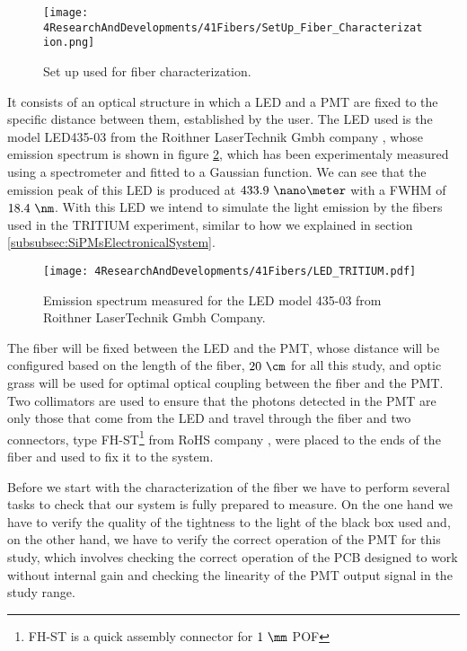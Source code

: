\begin{figure}[h]
\centering
\texttt{[image: 4ResearchAndDevelopments/41Fibers/SetUp\_Fiber\_Characterization.png]}
\caption{Set up used for fiber characterization.\label{fig:SetUpFiberCharacterization}}
\end{figure}

It consists of an optical structure in which a LED and a PMT are fixed to the specific distance between them, established by the user. The LED used is the model LED435-03 from the Roithner LaserTechnik Gmbh company \cite{LEDRLT}, whose emission spectrum is shown in figure \ref{fig:LEDSpectrumTritium}, which has been experimentaly measured using a spectrometer and fitted to a Gaussian function. We can see that the emission peak of this LED is produced at $433.9~\nano\meter$ with a FWHM of $18.4~\nm$. With this LED we intend to simulate the light emission by the fibers used in the TRITIUM experiment, similar to how we explained in section \ref{subsubsec:SiPMsElectronicalSystem}.

\begin{figure}[h]
\centering
\texttt{[image: 4ResearchAndDevelopments/41Fibers/LED\_TRITIUM.pdf]}
\caption{Emission spectrum measured for the LED model 435-03 from Roithner LaserTechnik Gmbh Company.\label{fig:LEDSpectrumTritium}}
\end{figure}

The fiber will be fixed between the LED and the PMT, whose distance will be configured based on the length of the fiber, $20~\cm$ for all this study, and optic grass will be used for optimal optical coupling between the fiber and the PMT. Two collimators are used to ensure that the photons detected in the PMT are only those that come from the LED and travel through the fiber and two connectors, type FH-ST\footnote{FH-ST is a quick assembly connector for $1~\mm$ POF} from RoHS company \cite{}, were placed to the ends of the fiber and used to fix it to the system. 

Before we start with the characterization of the fiber we have to perform several tasks to check that our system is fully prepared to measure. On the one hand we have to verify the quality of the tightness to the light of the black box used and, on the other hand, we have to verify the correct operation of the PMT for this study, which involves checking the correct operation of the PCB designed to work without internal gain and checking the linearity of the PMT output signal in the study range.

